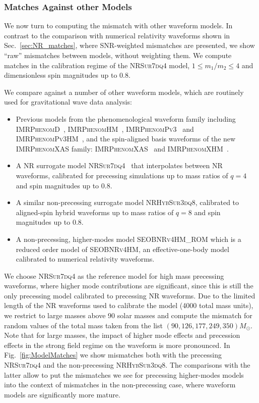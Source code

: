\documentclass[%
aps,
prd,
amssymb,
amsmath,
amsfonts,
eqsecnum,
showpacs,
nofootinbib,
floatfix,
twocolumn,
twoside,
a4paper,
superscriptaddress
]{revtex4-1}
\newcommand{\phD}{\textsc{IMRPhenomD}\xspace}
\newcommand{\phX}{\textsc{IMRPhenomXAS}\xspace}
\newcommand{\phHM}{\textsc{IMRPhenomHM}\xspace}
\newcommand{\phPvthree}{\textsc{IMRPhenomPv3}\xspace}
\newcommand{\phPvthreehm}{\textsc{IMRPhenomPv3HM}\xspace}
\newcommand{\phXHM}{\textsc{IMRPhenomXHM}\xspace}
\newcommand{\NRHybSur}{\textsc{NRHybSur3dq8}\xspace}
\newcommand{\NRSur}{\textsc{NRSur7dq4}\xspace}
\newcommand{\seobnrvforhm}{\textsc{SEOBNRv4HM}\xspace}
\newcommand{\seobnrvforhmrom}{\textsc{SEOBNRv4HM\_ROM}\xspace}
\begin{document}
\subsubsection{Matches Against other Models}\label{sec:model_matches}

We now turn to computing the mismatch with other waveform models. In contrast to the comparison with numerical relativity waveforms shown in Sec.~\ref{sec:NR_matches}, where SNR-weighted mismatches are presented, we show ``raw'' mismatches between models, without weighting them. We compute matches in the calibration regime of the \NRSur model, $ 1\leq m_1/m_2 \leq 4$ and dimensionless spin magnitudes up to $0.8$.

We compare against a number of other waveform models, which are routinely used for gravitational wave data analysis:
\begin{itemize}
    \item Previous models from the phenomenological waveform family including \phD~\cite{Husa:2015iqa,Khan:2015jqa}, \phHM~\cite{London:2017bcn}, \phPvthree~\cite{Khan:2018fmp} and \phPvthreehm~\cite{Khan:2019kot}, and the spin-aligned basis waveforms of the new \phX family: \phX~\cite{Pratten:2020fqn} and \phXHM~\cite{Garcia-Quiros:2020qpx}.
    \item A NR surrogate model \NRSur~\cite{Varma:2019csw} that interpolates between NR waveforms, calibrated for precessing simulations up to mass ratios of $q=4$ and spin magnitudes up to $0.8$.
    \item A similar non-precessing surrogate model \NRHybSur \cite{Varma:2018mmi}, calibrated to aligned-spin hybrid waveforms up to mass ratios of $q=8$ and spin magnitudes up to $0.8$.
    \item A non-precessing, higher-modes model \seobnrvforhmrom \cite{Cotesta:2020qhw} which is a reduced order model of \seobnrvforhm \cite{Bohe:2016gbl,Cotesta:2018fcv}, an effective-one-body model calibrated to numerical relativity waveforms.
\end{itemize}

We choose \NRSur as the reference model for high mass precessing waveforms, where higher mode contributions are significant, since this is still the only precessing model calibrated to precessing NR waveforms. Due to the limited length of the NR waveforms used to calibrate the model (4000 total mass units), we restrict to large masses above 90 solar masses and compute the mismatch for random values of the total mass taken from the list $(90, 126, 177, 249, 350) M_{\odot}$. Note that for large masses, the impact of higher mode effects and precession effects in the strong field regime on the waveform is more pronounced. 
In Fig.~\ref{fig:ModelMatches} we show mismatches both with the precessing \NRSur \cite{Varma:2019csw} and the non-precessing \NRHybSur \cite{Varma:2018mmi}. The comparisons with the latter allow to put the mismatches we see for precessing higher-modes models into the context of mismatches in the non-precessing case, where waveform models are significantly more mature.
\end{document}
